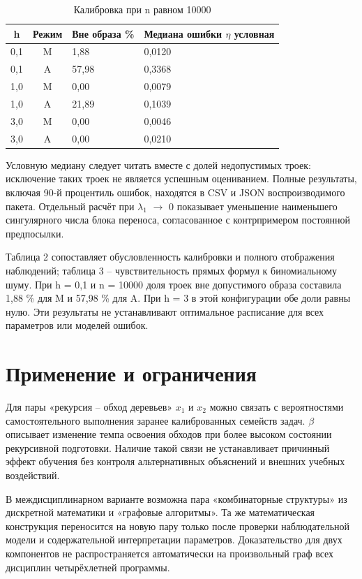 \documentclass[blind]{psta}
\begin{document}
\begin{table}[htbp]
\caption{Калибровка при n равном 10000}
\label{tab:88}
\centering\small
\renewcommand{\arraystretch}{1.25}
\setlength{\tabcolsep}{3pt}
\begin{tabular}{|c|c|p{.24\linewidth}|p{.30\linewidth}|}
\hline
\textbf{h} & \textbf{Режим} & \textbf{Вне образа \%} & \textbf{Медиана ошибки $\eta$ условная}\\\hline
0,1 & M & 1,88 & 0,0120\\\hline
0,1 & A & 57,98 & 0,3368\\\hline
1,0 & M & 0,00 & 0,0079\\\hline
1,0 & A & 21,89 & 0,1039\\\hline
3,0 & M & 0,00 & 0,0046\\\hline
3,0 & A & 0,00 & 0,0210\\\hline
\end{tabular}
\end{table}
Условную медиану следует читать вместе с долей недопустимых троек: исключение таких троек не является успешным оцениванием. Полные результаты, включая 90-й процентиль ошибок, находятся в CSV и JSON воспроизводимого пакета. Отдельный расчёт при $\lambda_{1}$ $\to$ 0 показывает уменьшение наименьшего сингулярного числа блока переноса, согласованное с контрпримером постоянной предпосылки.

Таблица 2 сопоставляет обусловленность калибровки и полного отображения наблюдений; таблица 3 – чувствительность прямых формул к биномиальному шуму. При h = 0,1 и n = 10000 доля троек вне допустимого образа составила 1,88 \% для M и 57,98 \% для A. При h = 3 в этой конфигурации обе доли равны нулю. Эти результаты не устанавливают оптимальное расписание для всех параметров или моделей ошибок.

\FloatBarrier
\section{Применение и ограничения}
Для пары «рекурсия – обход деревьев» $x_{1}$ и $x_{2}$ можно связать с вероятностями самостоятельного выполнения заранее калиброванных семейств задач. $\beta$ описывает изменение темпа освоения обходов при более высоком состоянии рекурсивной подготовки. Наличие такой связи не устанавливает причинный эффект обучения без контроля альтернативных объяснений и внешних учебных воздействий.

В междисциплинарном варианте возможна пара «комбинаторные структуры» из дискретной математики и «графовые алгоритмы». Та же математическая конструкция переносится на новую пару только после проверки наблюдательной модели и содержательной интерпретации параметров. Доказательство для двух компонентов не распространяется автоматически на произвольный граф всех дисциплин четырёхлетней программы.
\end{document}
